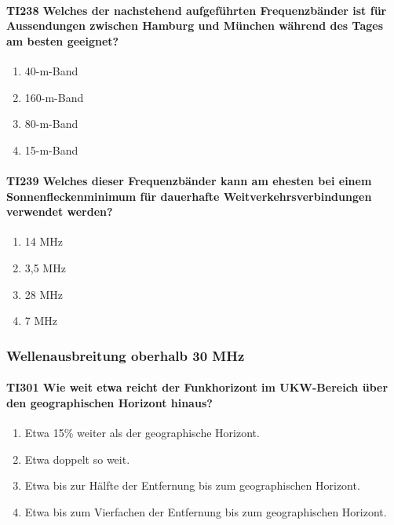 \documentclass[8pt]{article}
\begin{document}
\paragraph*{TI238 Welches der nachstehend aufgeführten Frequenzbänder ist für Aussendungen zwischen Hamburg und München während des Tages am besten geeignet?} 
\begin{enumerate}[nolistsep,label=\Alph*]
\item 40-m-Band
\item 160-m-Band
\item 80-m-Band
\item 15-m-Band
\end{enumerate}

\paragraph*{TI239 Welches dieser Frequenzbänder kann am ehesten bei einem Sonnenfleckenminimum für dauerhafte Weitverkehrsverbindungen verwendet werden?}
\begin{enumerate}[nolistsep,label=\Alph*]
\item 14 MHz
\item 3,5 MHz
\item 28 MHz
\item 7 MHz
\end{enumerate}

\pagebreak
\subsubsection{Wellenausbreitung oberhalb 30 MHz} 
\paragraph*{TI301 Wie weit etwa reicht der Funkhorizont im UKW-Bereich über den geographischen Horizont hinaus?}
\begin{enumerate}[nolistsep,label=\Alph*]
\item Etwa 15\% weiter als der geographische Horizont.
\item Etwa doppelt so weit.
\item Etwa bis zur Hälfte der Entfernung bis zum geographischen Horizont.
\item Etwa bis zum Vierfachen der Entfernung bis zum geographischen Horizont.
\end{enumerate}
\end{document}
